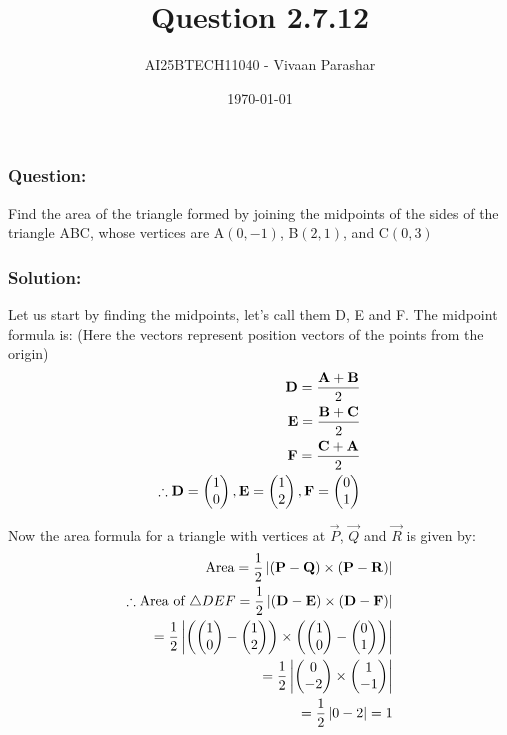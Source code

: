 \documentclass{beamer}
\title{Question 2.7.12}
\author{AI25BTECH11040 - Vivaan Parashar}
\date{\today}
\begin{document}
\frame{\titlepage}

\begin{frame}
    \frametitle{Question: }
    Find the area of the triangle formed by joining the midpoints of the sides of the triangle ABC, whose vertices are A$(0, -1)$, B$(2, 1)$, and C$(0, 3)$
\end{frame}

\begin{frame}
    \frametitle{Solution: }
    Let us start by finding the midpoints, let's call them D, E and F.
    The midpoint formula is: (Here the vectors represent position vectors of the points from the origin)
    \begin{align}
        \mathbf{D} = \frac{\mathbf{A}+\mathbf{B}}{2} \\
        \mathbf{E} = \frac{\mathbf{B}+\mathbf{C}}{2} \\
        \mathbf{F} = \frac{\mathbf{C}+\mathbf{A}}{2} \\
        \therefore \mathbf{D} = \begin{pmatrix}1       \\ 0\end{pmatrix}, \mathbf{E} = \begin{pmatrix}1 \\ 2\end{pmatrix}, \mathbf{F} = \begin{pmatrix}0 \\ 1\end{pmatrix}
    \end{align}
\end{frame}
\begin{frame}
    Now the area formula for a triangle with vertices at $\vec{P}$, $\vec{Q}$ and $\vec{R}$ is given by:
    \begin{align}
        \text{Area} = \frac{1}{2} \left| (\mathbf{P} - \mathbf{Q}) \times (\mathbf{P} - \mathbf{R}) \right|                              \\
        \therefore \text{Area of } \triangle DEF = \frac{1}{2} \left| (\mathbf{D} - \mathbf{E}) \times (\mathbf{D} - \mathbf{F}) \right| \\
        = \frac{1}{2} \left| \left( \begin{pmatrix}1 \\ 0\end{pmatrix} - \begin{pmatrix}1 \\ 2\end{pmatrix} \right) \times \left( \begin{pmatrix}1 \\ 0\end{pmatrix} - \begin{pmatrix}0 \\ 1\end{pmatrix} \right) \right|\\
        = \frac{1}{2} \left| \begin{pmatrix}0 \\ -2\end{pmatrix} \times \begin{pmatrix}1 \\ -1\end{pmatrix} \right|\\
        = \frac{1}{2} \left| 0 - 2 \right| = 1
    \end{align}
\end{frame}
\end{document}
